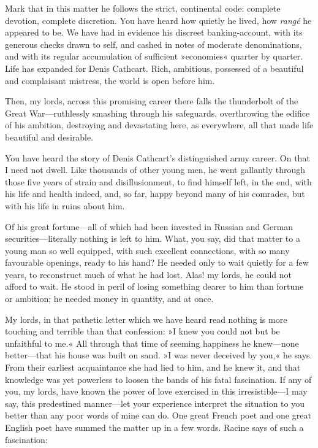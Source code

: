 \begin{dialogue}
\smallskip 

Mark that in this matter he follows the strict, continental code: complete devotion, complete discretion. You have heard how quietly he lived, how \textit{rangé} he appeared to be. We have had in evidence his discreet banking-account, with its generous checks drawn to self, and cashed in notes of moderate denominations, and with its regular accumulation of sufficient »economies« quarter by quarter. Life has expanded for Denis Cathcart. Rich, ambitious, possessed of a beautiful and complaisant mistress, the world is open before him.

\smallskip 

Then, my lords, across this promising career there falls the thunderbolt of the Great War—ruthlessly smashing through his safeguards, overthrowing the edifice of his ambition, destroying and devastating here, as everywhere, all that made life beautiful and desirable.

\smallskip 

You have heard the story of Denis Cathcart's distinguished army career. On that I need not dwell. Like thousands of other young men, he went gallantly through those five years of strain and disillusionment, to find himself left, in the end, with his life and health indeed, and, so far, happy beyond many of his comrades, but with his life in ruins about him.

\smallskip 

Of his great fortune—all of which had been invested in Russian and German securities—literally nothing is left to him. What, you say, did that matter to a young man so well equipped, with such excellent connections, with so many favourable openings, ready to his hand? He needed only to wait quietly for a few years, to reconstruct much of what he had lost. Alas! my lords, he could not afford to wait. He stood in peril of losing something dearer to him than fortune or ambition; he needed money in quantity, and at once.

\smallskip 

My lords, in that pathetic letter which we have heard read nothing is more touching and terrible than that confession: »I knew you could not but be unfaithful to me.« All through that time of seeming happiness he knew—none better—that his house was built on sand. »I was never deceived by you,« he says. From their earliest acquaintance she had lied to him, and he knew it, and that knowledge was yet powerless to loosen the bands of his fatal fascination. If any of you, my lords, have known the power of love exercised in this irresistible—I may say, this predestined manner—let your experience interpret the situation to you better than any poor words of mine can do. One great French poet and one great English poet have summed the matter up in a few words. Racine says of such a fascination:


\end{dialogue}
